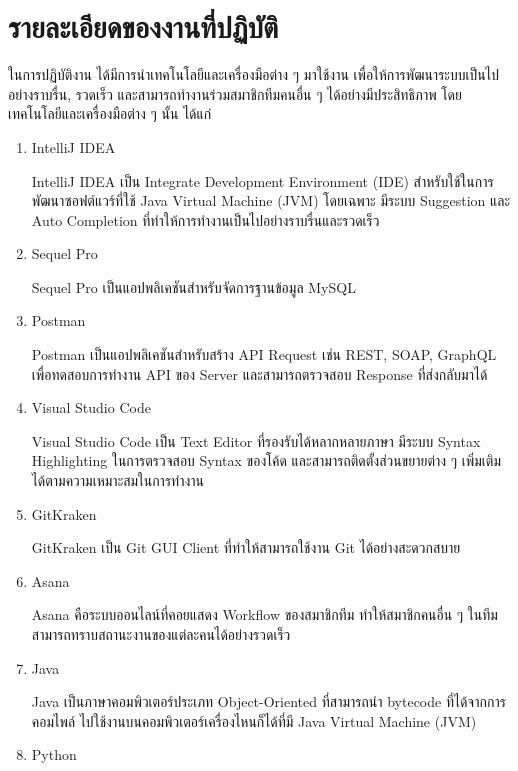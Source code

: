 \section{รายละเอียดของงานที่ปฏิบัติ}
ในการปฏิบัติงาน ได้มีการนำเทคโนโลยีและเครื่องมือต่าง ๆ มาใช้งาน เพื่อให้การพัฒนาระบบเป็นไปอย่างราบรื่น, รวดเร็ว และสามารถทำงานร่วมสมาชิกทีมคนอื่น ๆ ได้อย่างมีประสิทธิภาพ  โดยเทคโนโลยีและเครื่องมือต่าง ๆ นั้น ได้แก่
\begin{enumerate}
	\item IntelliJ IDEA
	
	IntelliJ IDEA เป็น Integrate Development Environment (IDE) สำหรับใช้ในการพัฒนาซอฟต์แวร์ที่ใช้ Java Virtual Machine (JVM) โดยเฉพาะ มีระบบ Suggestion และ Auto Completion ที่ทำให้การทำงานเป็นไปอย่างราบรื่นและรวดเร็ว ~\cite{intellij}
	
	\item Sequel Pro
	
	Sequel Pro เป็นแอปพลิเคชันสำหรับจัดการฐานข้อมูล MySQL ~\cite{sequelpro}
	
	\item Postman
	
	Postman เป็นแอปพลิเคชันสำหรับสร้าง API Request เช่น REST, SOAP, GraphQL เพื่อทดสอบการทำงาน API ของ Server และสามารถตรวจสอบ Response ที่ส่งกลับมาได้ ~\cite{postman}
	
	\item Visual Studio Code
	
	Visual Studio Code เป็น Text Editor ที่รองรับได้หลากหลายภาษา มีระบบ Syntax Highlighting ในการตรวจสอบ Syntax ของโค้ด และสามารถติดตั้งส่วนขยายต่าง ๆ เพิ่มเติมได้ตามความเหมาะสมในการทำงาน ~\cite{vscode}
	
	\item GitKraken
	
	GitKraken เป็น Git GUI Client ที่ทำให้สามารถใช้งาน Git ได้อย่างสะดวกสบาย ~\cite{gitkraken}
	
	\item Asana
	
	Asana คือระบบออนไลน์ที่คอยแสดง Workflow ของสมาชิกทีม ทำให้สมาชิกคนอื่น ๆ ในทีมสามารถทราบสถานะงานของแต่ละคนได้อย่างรวดเร็ว ~\cite{asana}
	
	\item Java
	
	Java เป็นภาษาคอมพิวเตอร์ประเภท Object-Oriented ที่สามารถนำ bytecode ที่ได้จากการคอมไพล์ ไปใช้งานบนคอมพิวเตอร์เครื่องไหนก็ได้ที่มี Java Virtual Machine (JVM) ~\cite{java}
	
	\item Python
	

\end{enumerate}
